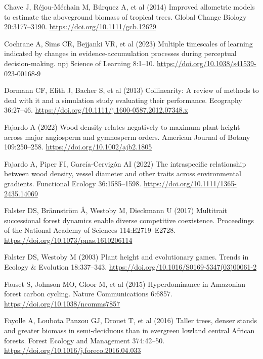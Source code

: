 \documentclass[
  12pt,
  letterpaper,
  DIV=11,
  numbers=noendperiod]{scrartcl}
\newlength{\cslhangindent}
\newenvironment{CSLReferences}[2] %
 {\begin{list}{}{%
  \setlength{\itemindent}{0pt}
  \setlength{\leftmargin}{0pt}
  \setlength{\parsep}{0pt}
  \ifodd #1
   \setlength{\leftmargin}{\cslhangindent}
   \setlength{\itemindent}{-1\cslhangindent}
  \fi
  \setlength{\itemsep}{#2\baselineskip}}}
 {\end{list}}
\begin{document}
\begin{CSLReferences}{1}{1}
Chave J, Réjou-Méchain M, Búrquez A, et al (2014) Improved allometric
models to estimate the aboveground biomass of tropical trees. Global
Change Biology 20:3177--3190. \url{https://doi.org/10.1111/gcb.12629}

Cochrane A, Sims CR, Bejjanki VR, et al (2023) Multiple timescales of
learning indicated by changes in evidence-accumulation processes during
perceptual decision-making. npj Science of Learning 8:1--10.
\url{https://doi.org/10.1038/s41539-023-00168-9}

Dormann CF, Elith J, Bacher S, et al (2013) Collinearity: A review of
methods to deal with it and a simulation study evaluating their
performance. Ecography 36:27--46.
\url{https://doi.org/10.1111/j.1600-0587.2012.07348.x}

Fajardo A (2022) Wood density relates negatively to maximum plant height
across major angiosperm and gymnosperm orders. American Journal of
Botany 109:250--258. \url{https://doi.org/10.1002/ajb2.1805}

Fajardo A, Piper FI, García-Cervigón AI (2022) The intraspecific
relationship between wood density, vessel diameter and other traits
across environmental gradients. Functional Ecology 36:1585--1598.
\url{https://doi.org/10.1111/1365-2435.14069}

Falster DS, Brännström Å, Westoby M, Dieckmann U (2017) Multitrait
successional forest dynamics enable diverse competitive coexistence.
Proceedings of the National Academy of Sciences 114:E2719--E2728.
\url{https://doi.org/10.1073/pnas.1610206114}

Falster DS, Westoby M (2003) Plant height and evolutionary games. Trends
in Ecology \& Evolution 18:337--343.
\url{https://doi.org/10.1016/S0169-5347(03)00061-2}

Fauset S, Johnson MO, Gloor M, et al (2015) Hyperdominance in
{Amazonian} forest carbon cycling. Nature Communications 6:6857.
\url{https://doi.org/10.1038/ncomms7857}

Fayolle A, Loubota Panzou GJ, Drouet T, et al (2016) Taller trees,
denser stands and greater biomass in semi-deciduous than in evergreen
lowland central {African} forests. Forest Ecology and Management
374:42--50. \url{https://doi.org/10.1016/j.foreco.2016.04.033}


\end{CSLReferences}
\end{document}
